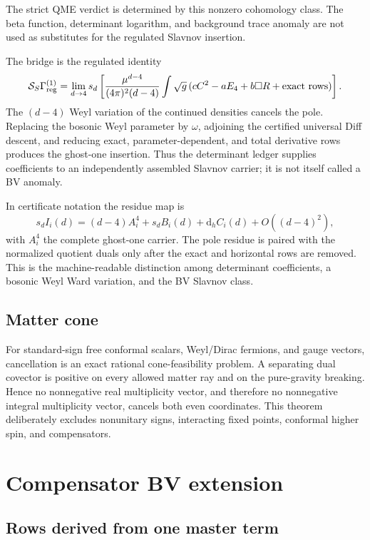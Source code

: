 \documentclass[11pt]{article}
\theoremstyle{definition}
\theoremstyle{remark}
\newcommand{\dd}{\mathrm d}
\begin{document}
The strict QME verdict is determined by this nonzero cohomology class.  The
beta function, determinant logarithm, and background trace anomaly are not
used as substitutes for the regulated Slavnov insertion.

The bridge is the regulated identity
\[
 \mathcal S_S\Gamma_{\rm reg}^{(1)}
 =\lim_{d\to4}s_d\left[
 \frac{\mu^{d-4}}{(4\pi)^2(d-4)}
 \int\sqrt g\,(cC^2-aE_4+b\Box R+\text{exact rows})\right].
\]
The $(d-4)$ Weyl variation of the continued densities cancels the pole.
Replacing the bosonic Weyl parameter by $\omega$, adjoining the certified
universal Diff descent, and reducing exact, parameter-dependent, and total
derivative rows produces the ghost-one insertion.  Thus the determinant
ledger supplies coefficients to an independently assembled Slavnov carrier;
it is not itself called a BV anomaly.

In certificate notation the residue map is
\[
 s_d I_i(d)=(d-4)A_i^4+s_dB_i(d)+\dd_hC_i(d)
             +O((d-4)^2),
\]
with $A_i^4$ the complete ghost-one carrier.  The pole residue is paired with
the normalized quotient duals only after the exact and horizontal rows are
removed.  This is the machine-readable distinction among determinant
coefficients, a bosonic Weyl Ward variation, and the BV Slavnov class.

\subsection{Matter cone}

For standard-sign free conformal scalars, Weyl/Dirac fermions, and gauge
vectors, cancellation is an exact rational cone-feasibility problem.  A
separating dual covector is positive on every allowed matter ray and on the
pure-gravity breaking.  Hence no nonnegative real multiplicity vector, and
therefore no nonnegative integral multiplicity vector, cancels both even
coordinates.  This theorem deliberately excludes nonunitary signs,
interacting fixed points, conformal higher spin, and compensators.

\section{Compensator BV extension}

\subsection{Rows derived from one master term}
\end{document}
